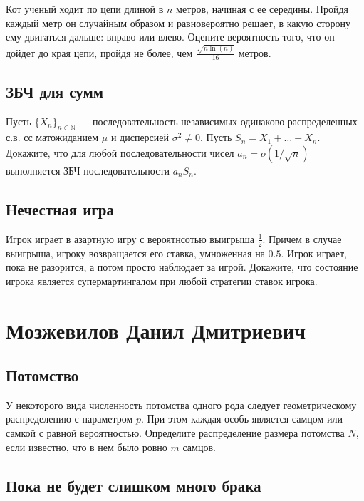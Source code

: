 \documentclass[12pt]{article}
\newcommand\N{\mathbb{N}}
\begin{document}
Кот ученый ходит по цепи длиной в $n$ метров, начиная с ее середины. Пройдя каждый метр он случайным образом и равновероятно решает, в какую сторону ему двигаться дальше: вправо или влево. Оцените вероятность того, что он дойдет до края цепи, пройдя не более, чем $\frac{\sqrt{n \ln(n)}}{16}$ метров.



\subsection{ЗБЧ для сумм}
Пусть $\{X_n\}_{n \in \N}$ --- последовательность независимых одинаково распределенных с.в. сс матожиданием $\mu$ и дисперсией $\sigma^2 \ne 0$. Пусть $S_n = X_1 + \dots + X_n$. Докажите, что для любой последовательности чисел $a_n = o(1/\sqrt{n})$ выполняется ЗБЧ последовательности $a_n S_n$.



\subsection{Нечестная игра}

Игрок играет в азартную игру с вероятнсотью выигрыша $\frac{1}{2}$. Причем в случае выигрыша, игроку возвращается его ставка, умноженная на $0.5$. Игрок играет, пока не разорится, а потом просто наблюдает за игрой. Докажите, что состояние игрока является супермартингалом при любой стратегии ставок игрока.



\newpage
\section{Мозжевилов Данил Дмитриевич}

\subsection{Потомство}

У некоторого вида численность потомства одного рода следует геометрическому распределению с параметром $p$. При этом каждая особь является самцом или самкой с равной вероятностью. Определите распределение размера потомства $N$, если известно, что в нем было ровно $m$ самцов.



\subsection{Пока не будет слишком много брака}
\end{document}
